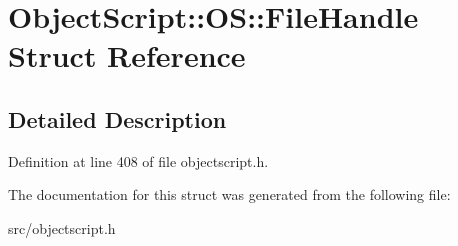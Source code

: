 \hypertarget{struct_object_script_1_1_o_s_1_1_file_handle}{}\section{Object\+Script\+:\+:OS\+:\+:File\+Handle Struct Reference}
\label{struct_object_script_1_1_o_s_1_1_file_handle}


\subsection{Detailed Description}


Definition at line 408 of file objectscript.\+h.



The documentation for this struct was generated from the following file\+:\begin{DoxyCompactItemize}
\item 
src/objectscript.\+h\end{DoxyCompactItemize}
